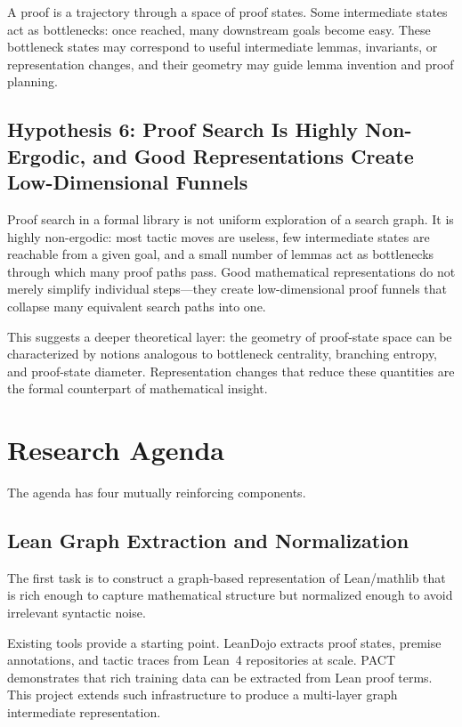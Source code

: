 \documentclass[12pt, a4paper]{article}
\begin{document}
A proof is a trajectory through a space of proof states. Some intermediate
states act as bottlenecks: once reached, many downstream goals become easy.
These bottleneck states may correspond to useful intermediate lemmas,
invariants, or representation changes, and their geometry may guide lemma
invention and proof planning.

\subsection{Hypothesis 6: Proof Search Is Highly Non-Ergodic, and Good
Representations Create Low-Dimensional Funnels}

Proof search in a formal library is not uniform exploration of a search graph.
It is highly non-ergodic: most tactic moves are useless, few intermediate
states are reachable from a given goal, and a small number of lemmas act as
bottlenecks through which many proof paths pass. Good mathematical
representations do not merely simplify individual steps---they create
low-dimensional proof funnels that collapse many equivalent search paths into
one.

This suggests a deeper theoretical layer: the geometry of proof-state space
can be characterized by notions analogous to bottleneck centrality, branching
entropy, and proof-state diameter. Representation changes that reduce these
quantities are the formal counterpart of mathematical insight.

\section{Research Agenda}
\label{sec:agenda}

The agenda has four mutually reinforcing components.

\subsection{Lean Graph Extraction and Normalization}
\label{sec:extraction}

The first task is to construct a graph-based representation of Lean/mathlib
that is rich enough to capture mathematical structure but normalized enough
to avoid irrelevant syntactic noise.

Existing tools provide a starting point. LeanDojo \citep{yang2023leandojo}
extracts proof states, premise annotations, and tactic traces from Lean~4
repositories at scale. PACT \citep{han2021pact} demonstrates that rich
training data can be extracted from Lean proof terms. This project extends
such infrastructure to produce a multi-layer graph intermediate
representation.
\end{document}

